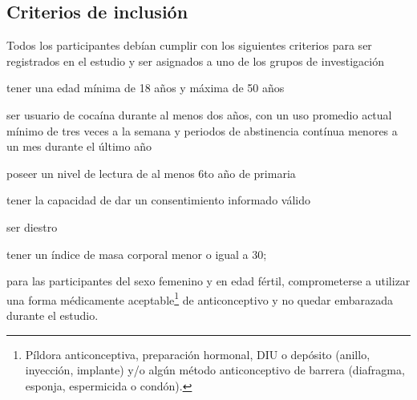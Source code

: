 \subsection{Criterios de inclusión}
Todos los participantes debían cumplir con los siguientes criterios para ser registrados en el estudio y ser asignados a uno de los grupos de investigación
\begin{enumerate*}[label=\emph{\alph*}), before=\unskip{: }, itemjoin={{; }}, itemjoin*={{, y }}]
    \item tener una edad mínima de 18 años y máxima de 50 años
    \item ser usuario de cocaína durante al menos dos  años, con un uso promedio actual mínimo de tres veces a la semana y periodos de abstinencia contínua menores a un mes durante el último año
    \item poseer un nivel de lectura de al menos 6to año de primaria
    \item tener la capacidad de dar un consentimiento informado válido
    \item ser diestro
    \item tener un índice de masa corporal menor o igual a 30;
    \item para las participantes del sexo femenino y en edad fértil, comprometerse a utilizar una forma médicamente aceptable\footnote{Píldora anticonceptiva, preparación hormonal, DIU o depósito (anillo, inyección, implante) y/o algún método anticonceptivo de barrera (diafragma, esponja, espermicida o condón).} de anticonceptivo y no quedar embarazada durante el estudio.
\end{enumerate*}

